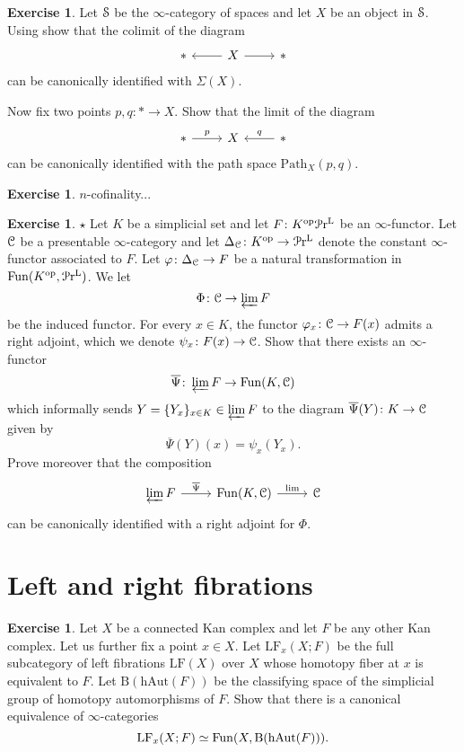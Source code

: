 \documentclass[10pt,a4paper,reqno,oneside]{book} %
\theoremstyle{plain}
\theoremstyle{definition}
\newtheorem{exercise}[thm]{Exercise}
\theoremstyle{remark}
\numberwithin{equation}{section}
\begin{document}
\begin{exercise}
	Let $\mathcal S$ be the $\infty$-category of spaces and let $X$ be an object in $\mathcal S$.
	Using \cite[Theorem 4.2.4.1]{HTT} show that the colimit of the diagram
	\[ \begin{tikzcd}
		* & X \arrow{l} \arrow{r} & *
	\end{tikzcd} \]
	can be canonically identified with $\Sigma(X)$.
	
	Now fix two points $p, q \colon * \to X$. Show that the limit of the diagram
	\[ \begin{tikzcd}
		* \arrow{r}{p} & X & * \arrow{l}[swap]{q}
	\end{tikzcd} \]
	can be canonically identified with the path space $\mathrm{Path}_X(p,q)$.
\end{exercise}

\begin{exercise}
	$n$-cofinality...
\end{exercise}

\begin{exercise}
	$\star$ Let $K$ be a simplicial set and let $F \colon K^\mathrm{op} \mathcal{P}\mathrm{r}^\mathrm L$ be an $\infty$-functor.
	Let $\mathcal C$ be a presentable $\infty$-category and let $\Delta_\mathcal C \colon K^\mathrm{op} \to \mathcal{P}\mathrm{r}^\mathrm L$ denote the constant $\infty$-functor associated to $F$.
	Let $\varphi \colon \Delta_\mathcal C \to F$ be a natural transformation in $\operatorname{Fun}(K^\mathrm{op}, \mathcal{P}\mathrm{r}^\mathrm L)$.
	We let
	\[ \Phi \colon \mathcal C \to \varprojlim F \]
	be the induced functor.
	For every $x \in K$, the functor $\varphi_x \colon \mathcal C \to F(x)$ admits a right adjoint, which we denote $\psi_x \colon F(x) \to \mathcal C$.
	Show that there exists an $\infty$-functor
	\[ \overline{\Psi} \colon \varprojlim F \to \operatorname{Fun}(K, \mathcal C) \]
	which informally sends $Y = \{Y_x\}_{x \in K} \in \varprojlim F$ to the diagram $\overline{\Psi}(Y) \colon K \to \mathcal C$ given by
	\[ \overline{\Psi}(Y)(x) = \psi_x(Y_x) . \]
	Prove moreover that the composition
	\[ \begin{tikzcd}
		\varprojlim F \arrow{r}{\overline{\Psi}} & \Fun(K, \cC) \arrow{r}{\mathrm{lim}} & \cC
	\end{tikzcd} \]
	can be canonically identified with a right adjoint for $\Phi$.
\end{exercise}

\section{Left and right fibrations}

\begin{exercise}
	Let $X$ be a connected Kan complex and let $F$ be any other Kan complex.
	Let us further fix a point $x \in X$.
	Let $\mathrm{LF}_x(X;F)$ be the full subcategory of left fibrations $\mathrm{LF}(X)$ over $X$ whose homotopy fiber at $x$ is equivalent to $F$.
	Let $\mathrm{B}(\mathrm{hAut}(F))$ be the classifying space of the simplicial group of homotopy automorphisms of $F$.
	Show that there is a canonical equivalence of $\infty$-categories
	\[ \mathrm{LF}_x(X;F) \simeq \operatorname{Fun}(X, \mathrm{B}(\mathrm{hAut}(F))) . \]
\end{exercise}
\end{document}
